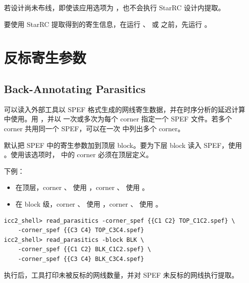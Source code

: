 \begin{noteBox}
若设计尚未布线，即使该应用选项为 ，也不会执行 StarRC 设计内提取。
\end{noteBox}

要使用 StarRC 提取得到的寄生信息，在运行 、 或  之前，先运行 。

\section{反标寄生参数}
\subsection*{Back-Annotating Parasitics}

可以读入外部工具以 SPEF 格式生成的网线寄生数据，并在时序分析的延迟计算中使用。用 ，并以  一次或多次为每个 corner 指定一个 SPEF 文件。若多个 corner 共用同一个 SPEF，可以在一次  中列出多个 corner。

默认把 SPEF 中的寄生参数加到顶层 block。要为下层 block 读入 SPEF，使用 。使用该选项时， 中的 corner 必须在顶层定义。

下例：
\begin{itemize}
  \item 在顶层，corner 、 使用 ，corner 、 使用 。
  \item 在 block 级，corner 、 使用 ，corner 、 使用 。
\end{itemize}
\begin{lstlisting}
icc2_shell> read_parasitics -corner_spef {{C1 C2} TOP_C1C2.spef} \
    -corner_spef {{C3 C4} TOP_C3C4.spef}
icc2_shell> read_parasitics -block BLK \
    -corner_spef {{C1 C2} BLK_C1C2.spef} \
    -corner_spef {{C3 C4} BLK_C3C4.spef}
\end{lstlisting}

 执行后，工具打印未被反标的网线数量，并对 SPEF 未反标的网线执行提取。

